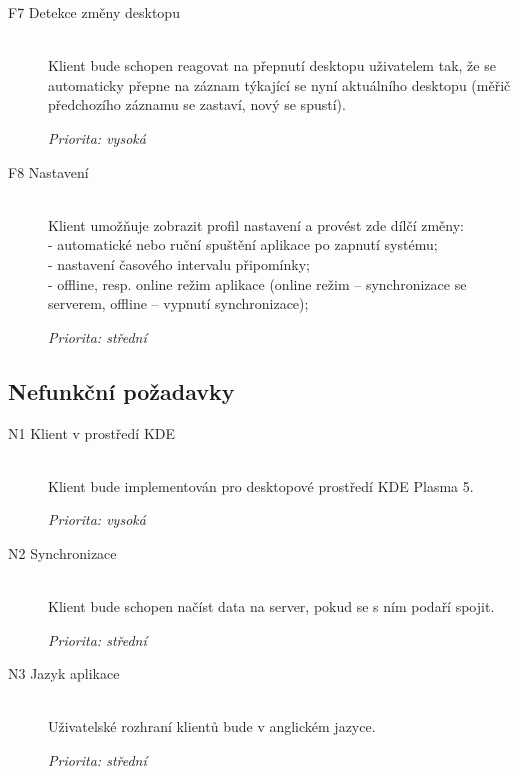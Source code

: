 \documentclass[thesis=B,czech]{FITthesis}[2012/06/26]
\begin{document}
\begin{description}
	\item[F7 Detekce změny desktopu] \hspace*{\fill} \\
	Klient bude schopen reagovat na přepnutí desktopu uživatelem tak, že se automaticky přepne na záznam týkající se nyní aktuálního desktopu (měřič předchozího záznamu se zastaví, nový se spustí). 
	\par
	\textit{Priorita: vysoká}
	
	\item[F8 Nastavení] \hspace*{\fill} \\
	Klient umožňuje zobrazit profil nastavení a provést zde dílčí změny: \\
	- automatické nebo ruční spuštění aplikace po zapnutí systému; \\
	- nastavení časového intervalu připomínky; \\
	- offline, resp. online režim aplikace (online režim -- synchronizace se serverem, offline -- vypnutí synchronizace);
	\par
	\textit{Priorita: střední}
	
\end{description}
\par
\subsection{Nefunkční požadavky}
\begin{description}
	\item[N1 Klient v prostředí KDE] \hspace*{\fill} \\
	Klient bude implementován pro desktopové prostředí KDE Plasma 5.  \par
	\textit{Priorita: vysoká}
	
	\item[N2 Synchronizace] \hspace*{\fill} \\
	Klient bude schopen načíst data na server, pokud se s ním podaří spojit.  \par
	\textit{Priorita: střední}
	
	\item[N3 Jazyk aplikace] \hspace*{\fill} \\
	Uživatelské rozhraní klientů bude v anglickém jazyce. \par
	\textit{Priorita: střední}
		
\end{description}
\end{document}
